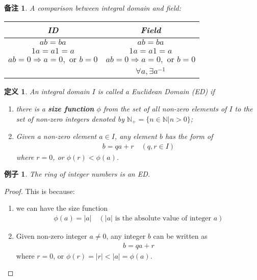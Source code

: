\documentclass[utf8]{ctexbook}
\newtheorem{definition}{定义}[section]
\newtheorem{memo}{备注}[section]
\newtheorem{example}{例子}[section]
\begin{document}
\begin{memo}
A comparison between integral domain and field:
\begin{center}

\begin{tabular}{|c|c|}
\hline
ID & Field \\
\hline
$ab = ba$ & $ab = ba$ \\
\hline
$1 a = a 1 = a $ & $1 a = a 1 = a $ \\
\hline
$ab = 0 \Longrightarrow a=0, \mbox{ or } b = 0$ & $ab = 0 \Longrightarrow a=0, \mbox{ or } b = 0$ \\
\hline
 & $\forall a, \exists a^{-1}$ \\
\hline
\end{tabular}

\end{center}

\end{memo}

\begin{definition}
An integral domain $I$ is called a Euclidean Domain (ED) if
\begin{enumerate}
\item{there is a \textbf{size function} $\phi$ from the set of all non-zero elements of $I$ to the set of non-zero integers denoted by $\mathbb{N}_+ = \{ n \in \mathbb{N} | n > 0 \}$;
}
\item{ Given a non-zero element $a \in I$, any element $b$ has the form of
\begin{align*}
b = q a + r \quad (q, r \in I)
\end{align*}
where $r=0$, or $\phi(r) < \phi(a)$.
}
\end{enumerate}
\end{definition}

\begin{example}
\label{example_R_int_is_ED}
The ring of integer numbers is an ED.
\end{example}

\begin{proof}
This is because:
\begin{enumerate}
\item{we can have the size function
\begin{align*}
\phi(a) = |a| \quad (|a| \mbox{ is the absolute value of integer } a) 
\end{align*}
}
\item{Given non-zero integer $a \neq 0$, any integer $b$ can be written as
\begin{align*}
b = q a + r 
\end{align*}
where $r=0$, or $\phi(r) = |r| < |a| = \phi(a)$.
}
\end{enumerate}

\end{proof}
\end{document}
